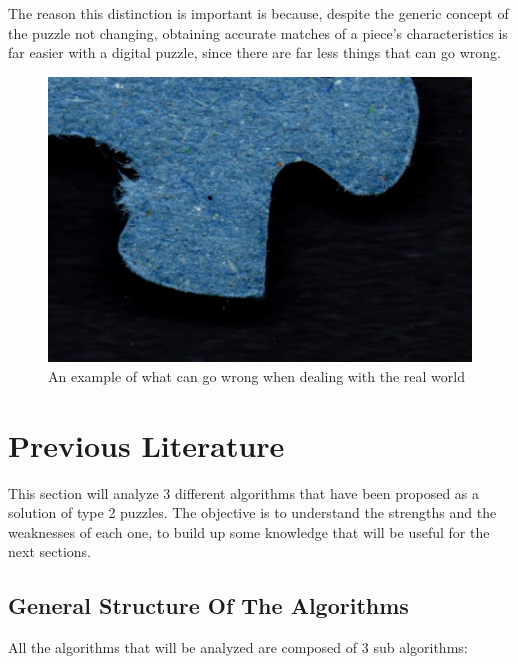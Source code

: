 \documentclass{article}
\begin{document}
The reason this distinction is important is because,
despite the generic concept of the puzzle not changing,
obtaining accurate matches of a piece's characteristics
is far easier with a digital puzzle,
since there are far less things that can go wrong.

\begin{figure}[H]
    \caption{An example of what can go wrong when dealing with the real world}\label{fig:figure_measurement_error}
    \includegraphics[height=0.25\textwidth]{pictures/example_bad_piece.jpg}
    \centering
\end{figure}

\section{Previous Literature}
This section will analyze 3 different algorithms that have been proposed
as a solution of type 2 puzzles. The objective is to understand the
strengths and the weaknesses of each one, to build up some knowledge
that will be useful for the next sections.

\subsection{General Structure Of The Algorithms}

All the algorithms that will be analyzed are composed of 3 sub algorithms:
\end{document}
